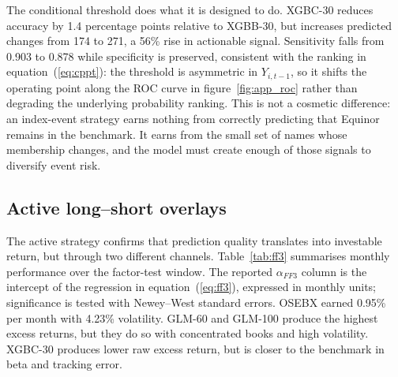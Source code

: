 The conditional threshold does what it is designed to do. XGBC-30 reduces accuracy by 1.4 percentage points relative to XGBB-30, but increases predicted changes from 174 to 271, a 56\% rise in actionable signal. Sensitivity falls from 0.903 to 0.878 while specificity is preserved, consistent with the ranking in equation~(\ref{eq:cppt}): the threshold is asymmetric in $Y_{i,t-1}$, so it shifts the operating point along the ROC curve in figure~\ref{fig:app_roc} rather than degrading the underlying probability ranking. This is not a cosmetic difference: an index-event strategy earns nothing from correctly predicting that Equinor remains in the benchmark. It earns from the small set of names whose membership changes, and the model must create enough of those signals to diversify event risk.

\subsection{Active long--short overlays}

The active strategy confirms that prediction quality translates into investable return, but through two different channels. Table~\ref{tab:ff3} summarises monthly performance over the factor-test window. The reported $\alpha_{FF3}$ column is the intercept of the regression in equation~(\ref{eq:ff3}), expressed in monthly units; significance is tested with Newey--West standard errors. OSEBX earned 0.95\% per month with 4.23\% volatility. GLM-60 and GLM-100 produce the highest excess returns, but they do so with concentrated books and high volatility. XGBC-30 produces lower raw excess return, but is closer to the benchmark in beta and tracking error.

